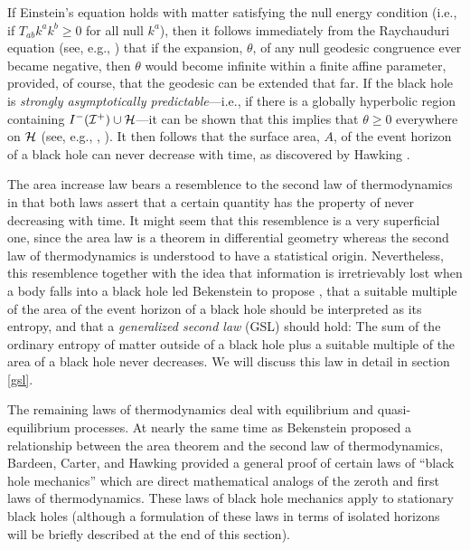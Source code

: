 \documentclass[12pt]{article}
\begin{document}
If Einstein's equation holds with matter satisfying the null energy
condition (i.e., if $T_{ab} k^a k^b \geq 0$ for all null $k^a$), then
it follows immediately from the Raychauduri equation (see, e.g.,
\cite{w3}) that if the expansion, $\theta$, of any null geodesic
congruence ever became negative, then $\theta$ would become infinite
within a finite affine parameter, provided, of course, that the
geodesic can be extended that far. If the black hole is {\it strongly
asymptotically predictable}---i.e., if there is a globally hyperbolic
region containing $I^-({\cal I}^+) \cup {\cal H}$---it can be shown
that this implies that $\theta \geq 0$ everywhere on $\cal H$ (see,
e.g., \cite{he}, \cite{w3}). It then follows that the surface area,
$A$, of the event horizon of a black hole can never decrease with
time, as discovered by Hawking \cite{h}.

The area increase law bears a resemblence to the second law of
thermodynamics in that both laws assert that a certain quantity has
the property of never decreasing with time. It might seem that this
resemblence is a very superficial one, since the area law is a theorem
in differential geometry whereas the second law of thermodynamics is
understood to have a statistical origin. Nevertheless, this
resemblence together with the idea that information is irretrievably
lost when a body falls into a black hole led Bekenstein to propose
\cite{b1}, \cite{b2} that a suitable multiple of the area of the event
horizon of a black hole should be interpreted as its entropy, and that
a {\it generalized second law} (GSL) should hold: The sum of the
ordinary entropy of matter outside of a black hole plus a suitable
multiple of the area of a black hole never decreases. We will discuss
this law in detail in section \ref{gsl}.

The remaining laws of thermodynamics deal with equilibrium and
quasi-equilibrium processes. At nearly the same time as Bekenstein
proposed a relationship between the area theorem and the second law of
thermodynamics, Bardeen, Carter, and Hawking \cite{bch} provided a
general proof of certain laws of ``black hole mechanics'' which are
direct mathematical analogs of the zeroth and first laws of
thermodynamics. These laws of black hole mechanics apply to stationary
black holes (although a formulation of these laws in terms of isolated
horizons will be briefly described at the end of this section).
\end{document}
